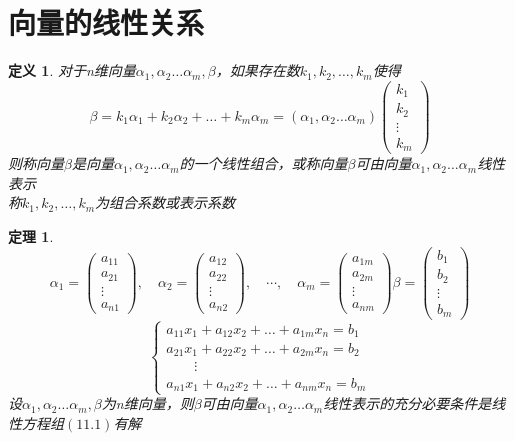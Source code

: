 \documentclass[12pt,oneside]{ctexbook}
\newtheorem{definition}[subsection]{定义}
\newtheorem{theorem}[subsection]{定理}
\begin{document}
\section{向量的线性关系}
\begin{definition}
    对于n维向量\(\alpha_1,\alpha_2 \dots \alpha_m,\beta \)，如果存在数\(k_1,k_2,\dots,k_m\)使得
    \[\beta = k_1\alpha_1 + k_2\alpha_2 + \dots + k_m\alpha_m = (\alpha_1,\alpha_2 \dots \alpha_m)
    \begin{pmatrix}
        k_1
        \\k_2
        \\ \vdots
        \\k_m
    \end{pmatrix}
    \]
    则称向量\(\beta\)是向量\(\alpha_1,\alpha_2 \dots \alpha_m\)的一个线性组合，或称向量\(\beta\)可由向量\(\alpha_1,\alpha_2 \dots \alpha_m\)线性表示
    \\称\(k_1,k_2,\dots,k_m\)为组合系数或表示系数
\end{definition}

\begin{theorem}
    \[\alpha_1=\begin{pmatrix}
        a_{11}
        \\a_{21}
        \\ \vdots
        \\a_{n1}
    \end{pmatrix},\quad
    \alpha_2=\begin{pmatrix}
        a_{12}
        \\a_{22}
        \\ \vdots
        \\a_{n2}
    \end{pmatrix},\quad
    \cdots,\quad
    \alpha_m=\begin{pmatrix}
        a_{1m}
        \\a_{2m}
        \\ \vdots
        \\a_{nm}
    \end{pmatrix}
    \beta=
    \begin{pmatrix}
        b_1
        \\b_2
        \\ \vdots
        \\b_m
    \end{pmatrix}
    \]
    \[\begin{cases}\tag{11.1}
        a_{11}x_1 + a_{12}x_2 + \dots + a_{1m}x_n = b_1\\
        a_{21}x_1 + a_{22}x_2 + \dots + a_{2m}x_n = b_2\\
        \quad\quad\vdots \\
        a_{n1}x_1 + a_{n2}x_2 + \dots + a_{nm}x_n = b_m
    \end{cases}
    \]
    设\(\alpha_1,\alpha_2 \dots \alpha_m,\beta \)为n维向量，则\(\beta\)可由向量\(\alpha_1,\alpha_2 \dots \alpha_m\)线性表示的充分必要条件是线性方程组\((11.1)\)有解
\end{theorem}
\end{document}
